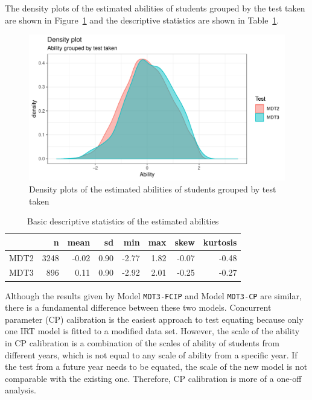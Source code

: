 \documentclass[a4paper]{report}
\begin{document}
The density plots of the estimated abilities of students grouped by the test taken are shown in Figure~\ref{fig:IMPRV_CP_eap} and the descriptive statistics  are shown in Table~\ref{tab:IMPRV_CP_eap_dsc}. 

\begin{figure}[H]
  \centering
  \includegraphics[width=\linewidth]{fig/IMPRV_CP_eap.pdf}
  \caption{\label{fig:IMPRV_CP_eap}Density plots of the estimated abilities of students grouped by test taken}
\end{figure}

\begin{table}[ht]
  \centering
  \begin{tabular}{rrrrrrrr}
    \hline
   & n & mean & sd & min & max & skew & kurtosis \\ 
    \hline
  MDT2 & 3248 & -0.02 & 0.90 & -2.77 & 1.82 & -0.07 & -0.48 \\ 
    MDT3 & 896 & 0.11 & 0.90 & -2.92 & 2.01 & -0.25 & -0.27 \\ 
     \hline
  \end{tabular}
  \caption{\label{tab:IMPRV_CP_eap_dsc}Basic descriptive statistics of the estimated abilities}
\end{table}

Although the results given by Model \texttt{MDT3-FCIP} and Model \texttt{MDT3-CP} are similar, there is a fundamental difference between these two models. Concurrent parameter (CP) calibration is the easiest approach to test equating because only one IRT model is fitted to a modified data set. However, the scale of the ability in CP calibration is a combination of the scales of ability of students from different years, which is not equal to any scale of ability from a specific year. If the test from a future year needs to be equated, the scale of the new model is not comparable with the existing one. Therefore, CP calibration is more of a one-off analysis. 
\end{document}
